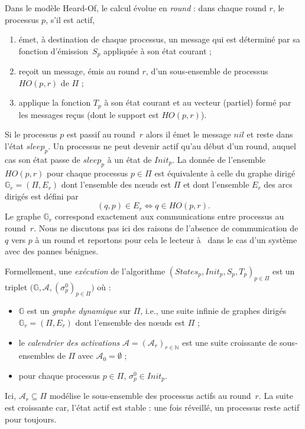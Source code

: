 \documentclass{article}
\begin{document}
Dans le mod\`ele Heard-Of, le calcul \'evolue en \emph{round} : dans chaque round $r$, 
	le processus $p$, s'il est actif,  
	\begin{enumerate}
	\item \'emet, \`a destination de chaque processus, un message qui est d\'etermin\'e par sa fonction d'\'emission~$S_p$  
		appliqu\'ee \`a son \'etat courant ;
	\item re\c{c}oit un message, \'emis au round $r$, d'un sous-ensemble de processus $HO(p,r)$ de $\Pi$ ;
        \item  applique la fonction  $T_p$ \`a son \'etat courant  et au vecteur (partiel) form\'e par les messages re\c{c}us (dont le support est 
         $HO(p,r)$).
	\end{enumerate}
Si le processus $p$ est passif au round~$r$ alors il \'emet le message $nil$ et reste dans l'\'etat $sleep_p$.
Un processus ne peut devenir actif qu'au d\'ebut d'un round, auquel cas son \'etat passe de $sleep_p$ \`a 
	un \'etat de $Init_p$.
La donn\'ee de l'ensemble $HO(p,r)$ pour chaque processus $p \in \Pi$ est \'equivalente \`a celle du graphe dirig\'e
	$\mathds{G}_r = (\Pi, E_r)$ dont l'ensemble des n\oe uds est $\Pi$ et dont l'ensemble $E_r$ des arcs dirig\'es 
	est d\'efini par
	$$ (q,p) \in E_r \Leftrightarrow q \in HO(p,r) .$$	
Le graphe $\mathds{G}_r $ correspond exactement aux communications entre processus au round~$r$.
Nous ne discutons pas ici des raisons de l'absence de communication de $q$ vers $p$ \`a un round et reportons pour cela  le lecteur 
	\`a~\cite{CB09} dans le cas d'un syst\`eme avec des pannes b\'enignes.

Formellement, une \emph{ex\'ecution} de l'algorithme  $(States_p, Init_p, S_p,T_p)_{p\in \Pi}$ est 
	un triplet $\big( \mathds{G} ,  \mathcal{A} , (\sigma^0_p)_{p \in \Pi} \big)$ où :
	\begin{itemize}
	\item $\mathds{G}$ est un \emph{graphe dynamique} sur $\Pi$, i.e., une suite infinie de graphes dirig\'es 
	$\mathds{G}_r = (\Pi, E_r)$ dont l'ensemble des n\oe uds est $\Pi$ ; 
	\item le \emph{calendrier des activations} $\mathcal{A} = (\mathcal{A}_r)_{r \in \mathds{N}}$ est une suite 
	croissante de sous-ensembles de $\Pi$ 
	avec $\mathcal{A}_0 = \emptyset$ ;
	\item pour chaque processus $p\in \Pi$, $\sigma^0_p \in Init_p$.
	\end{itemize}
Ici,  $\mathcal{A}_r \subseteq \Pi$ modélise le sous-ensemble des processus actifs au round~$r$.
La suite est croissante car, l'\'etat actif est stable : une fois r\'eveill\'e, un processus reste actif pour toujours.
\end{document}
